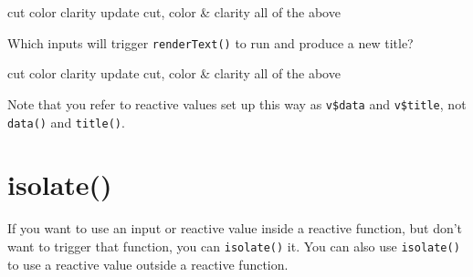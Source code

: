 \documentclass[
]{book}
\begin{document}
cut color clarity update cut, color \& clarity all of the above

Which inputs will trigger \texttt{renderText()} to run and produce a new title?

cut color clarity update cut, color \& clarity all of the above

Note that you refer to reactive values set up this way as \texttt{v\$data} and \texttt{v\$title}, not \texttt{data()} and \texttt{title()}.

\hypertarget{isolate}{%
\section{isolate()}\label{isolate}}

If you want to use an input or reactive value inside a reactive function, but don't want to trigger that function, you can \texttt{isolate()} it. You can also use \texttt{isolate()} to use a reactive value outside a reactive function.
\end{document}
